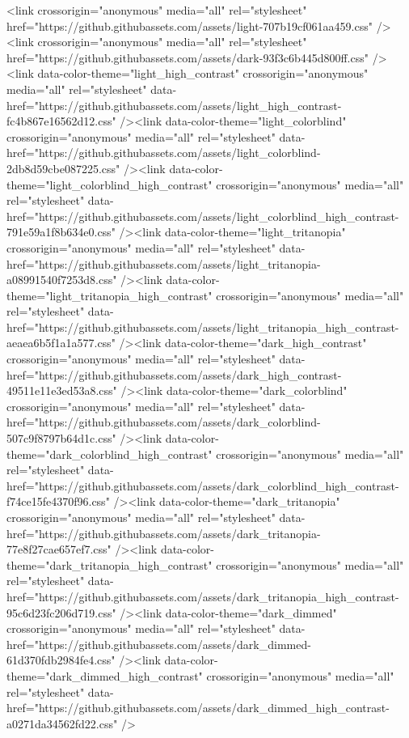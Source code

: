   <link crossorigin="anonymous" media="all" rel="stylesheet" href="https://github.githubassets.com/assets/light-707b19cf061aa459.css" /><link crossorigin="anonymous" media="all" rel="stylesheet" href="https://github.githubassets.com/assets/dark-93f3c6b445d800ff.css" /><link data-color-theme="light_high_contrast" crossorigin="anonymous" media="all" rel="stylesheet" data-href="https://github.githubassets.com/assets/light_high_contrast-fc4b867e16562d12.css" /><link data-color-theme="light_colorblind" crossorigin="anonymous" media="all" rel="stylesheet" data-href="https://github.githubassets.com/assets/light_colorblind-2db8d59cbe087225.css" /><link data-color-theme="light_colorblind_high_contrast" crossorigin="anonymous" media="all" rel="stylesheet" data-href="https://github.githubassets.com/assets/light_colorblind_high_contrast-791e59a1f8b634e0.css" /><link data-color-theme="light_tritanopia" crossorigin="anonymous" media="all" rel="stylesheet" data-href="https://github.githubassets.com/assets/light_tritanopia-a08991540f7253d8.css" /><link data-color-theme="light_tritanopia_high_contrast" crossorigin="anonymous" media="all" rel="stylesheet" data-href="https://github.githubassets.com/assets/light_tritanopia_high_contrast-aeaea6b5f1a1a577.css" /><link data-color-theme="dark_high_contrast" crossorigin="anonymous" media="all" rel="stylesheet" data-href="https://github.githubassets.com/assets/dark_high_contrast-49511e11e3ed53a8.css" /><link data-color-theme="dark_colorblind" crossorigin="anonymous" media="all" rel="stylesheet" data-href="https://github.githubassets.com/assets/dark_colorblind-507c9f8797b64d1c.css" /><link data-color-theme="dark_colorblind_high_contrast" crossorigin="anonymous" media="all" rel="stylesheet" data-href="https://github.githubassets.com/assets/dark_colorblind_high_contrast-f74ce15fe4370f96.css" /><link data-color-theme="dark_tritanopia" crossorigin="anonymous" media="all" rel="stylesheet" data-href="https://github.githubassets.com/assets/dark_tritanopia-77e8f27cae657ef7.css" /><link data-color-theme="dark_tritanopia_high_contrast" crossorigin="anonymous" media="all" rel="stylesheet" data-href="https://github.githubassets.com/assets/dark_tritanopia_high_contrast-95c6d23fc206d719.css" /><link data-color-theme="dark_dimmed" crossorigin="anonymous" media="all" rel="stylesheet" data-href="https://github.githubassets.com/assets/dark_dimmed-61d370fdb2984fe4.css" /><link data-color-theme="dark_dimmed_high_contrast" crossorigin="anonymous" media="all" rel="stylesheet" data-href="https://github.githubassets.com/assets/dark_dimmed_high_contrast-a0271da34562fd22.css" />


